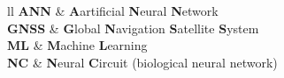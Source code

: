 
\begin{abbreviations}{ll} %
	\textbf{ANN} & \textbf{A}artificial \textbf{N}eural \textbf{N}etwork\\
	\textbf{GNSS} & \textbf{G}lobal \textbf{N}avigation \textbf{S}atellite \textbf{S}ystem\\
	\textbf{ML} & \textbf{M}achine \textbf{L}earning\\
	\textbf{NC} & \textbf{N}eural \textbf{C}ircuit (biological neural network)\\
\end{abbreviations}
